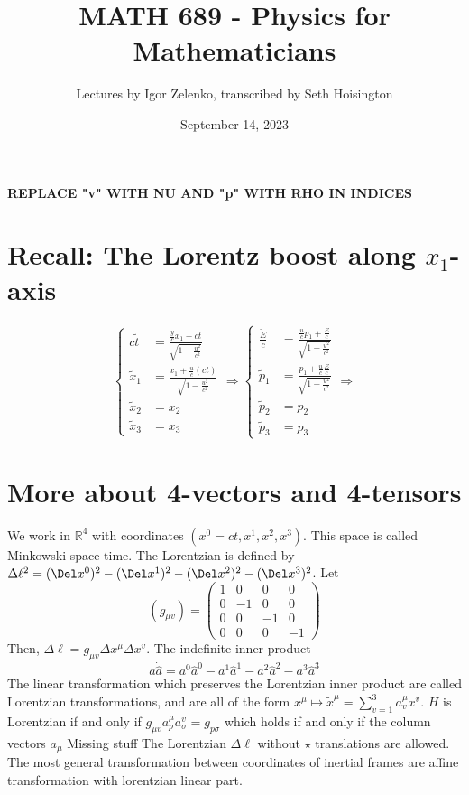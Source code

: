\documentclass{article}
\title{MATH 689 - Physics for Mathematicians}
\author{Lectures by Igor Zelenko, transcribed by Seth Hoisington}
\date{September 14, 2023}
\newcommand{\R}{\mathbb R}
\newcommand{\nl}{\newline\newline\noindent}
\begin{document}
\maketitle
\textbf{REPLACE "v" WITH NU AND "p" WITH RHO IN INDICES}
\section{Recall: The Lorentz boost along $x_1$-axis}
\[\left\{\begin{aligned}
    c\tilde{t}&=\frac{\frac{y}{c}x_1 + ct}{\sqrt{1-\frac{u^2}{c^2}}}\\
    \tilde{x}_1&=\frac{x_1+\frac{u}{c} (ct)}{\sqrt{1-\frac{u^2}{c^2}}}\\
    \tilde{x}_2&= x_2\\
    \tilde{x}_3&= x_3
\end{aligned}\right.\Rightarrow \left\{\begin{aligned}
    \frac{\tilde E}{c}&=\frac{\frac{u}{c}p_1 + \frac{E}{c}}{\sqrt{1-\frac{u^2}{c^2}}}\\
    \tilde{p}_1&=\frac{p_1+\frac{u}{c} \frac{E}{c}}{\sqrt{1-\frac{u^2}{c^2}}}\\
    \tilde{p}_2&= p_2\\
    \tilde{p}_3&= p_3
\end{aligned}\right.\Rightarrow \]
\section{More about 4-vectors and 4-tensors}
We work in $\R^4$ with coordinates $(x^0 = ct,x^1, x^2, x^3)$. This space is called Minkowski space-time. The Lorentzian is defined by $\Delta\ell^2  = (\Del x^0)^2 - (\Del x^1)^2 - (\Del x^2)^2-(\Del x^3)^2$. Let 
\[(g_{\mu v})=\begin{pmatrix}
    1 & 0 & 0 &0\\
    0& -1 & 0 & 0\\
    0& 0 & -1 & 0\\
    0& 0 & 0 & -1
\end{pmatrix}\]
Then, $\Delta\ell = g_{\mu v}\Delta x^\mu \Delta x^v$. The indefinite inner product
\[a\dot\hat a = a^0\hat a^0-a^1\hat a^1- a^2\hat a^2-a^3\hat a^3\]
The linear transformation which preserves the Lorentzian inner product are called Lorentzian transformations, and are all of the form $x^\mu\mapsto \tilde x^\mu = \sum_{v=1}^3 a^\mu_v x^v$. $H$ is Lorentzian if and only if $g_{\mu v} a^\mu_p a^v_\sigma = g_{p\sigma}$ which holds if and only if the column vectors $a_\mu$
Missing stuff
\nl
The Lorentzian $\Delta\ell$ without $\star$ translations are allowed. The most general transformation between coordinates of inertial frames are affine transformation with lorentzian linear part.
\end{document}
